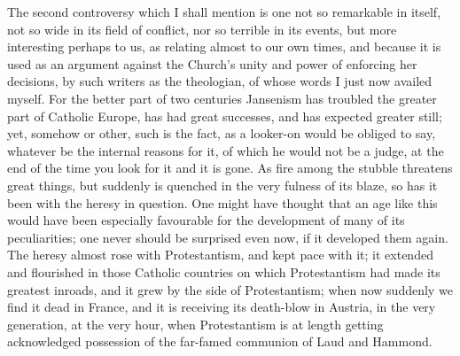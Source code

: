 The second controversy which I shall mention is one not so
remarkable in itself, not so wide in its field of conflict, nor so
terrible in its events, but more interesting perhaps to us, as
relating almost to our own times, and because it is used as an
argument against the Church's unity and power of enforcing her
decisions, by such writers as the theologian, of whose words I just
now availed myself. For the better part of two centuries Jansenism has
troubled the greater part of Catholic Europe, has had great successes,
and has expected greater still; yet, somehow or other, such is the
fact, as a looker-on would be obliged to say, whatever be the internal
reasons for it, of which he would not be a judge, at the end of the
time you look for it and it is gone. As fire among the stubble
threatens great things, but suddenly is quenched in the very fulness
of its blaze, so has it been with the heresy in question. One might
have thought that an age like this would have been especially
favourable for the development of many of its peculiarities; one never
should be surprised even now, if it developed them again. The heresy
almost rose with Protestantism, and kept pace with it; it extended and
flourished in those Catholic countries on which Protestantism had
made
its greatest inroads, and it grew by the side of Protestantism; when
now suddenly we find it dead in France, and it is receiving its
death-blow in Austria, in the very generation, at the very hour, when
Protestantism is at length getting acknowledged possession of the
far-famed communion of Laud and Hammond.

